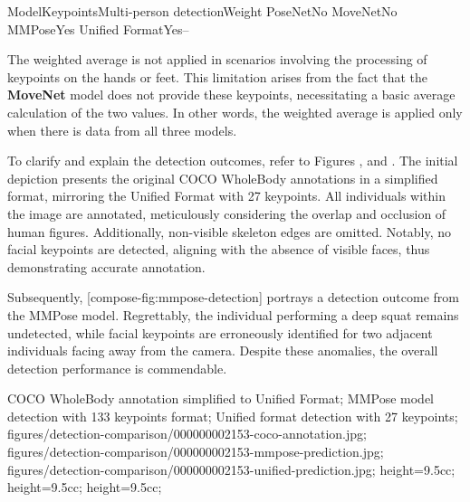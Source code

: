     \setupTABLE[r][1][style=bold]
    \setupTABLE[c][each][offset=3dd]
    \setupTABLE[frame=off]
    \setupTABLE[r][1][topframe=on,bottomframe=on]
    \setupTABLE[c][each][leftframe=on]
    \setupTABLE[c][1][leftframe=off]
    \setupTABLE[c][2,3,4][align=middle]
    \bTR\bTD Model\eTD\bTD              Keypoints\eTD\bTD  Multi-person detection\eTD\bTD  Weight\eTD\eTR
    \bTR\bTD PoseNet\eTD{}\eTD\bTD         No\eTD{}\eTD\eTR
    \bTR\bTD MoveNet\eTD{}\eTD\bTD         No\eTD{}\eTD\eTR
    \bTR\bTD MMPose\eTD{}\eTD\bTD        Yes\eTD{}\eTD\eTR
    \bTR\bTD Unified Format\eTD{}\eTD\bTD         Yes\eTD\bTD                     --\eTD\eTR


The weighted average is not applied in scenarios involving the processing of keypoints on the hands or feet. This limitation arises from the fact that the {\bf MoveNet} model does not provide these keypoints, necessitating a basic average calculation of the two values. In other words, the weighted average is applied only when there is data from all three models.

To clarify and explain the detection outcomes, refer to Figures ,  and . The initial depiction presents the original COCO WholeBody annotations in a simplified format, mirroring the Unified Format with 27 keypoints. All individuals within the image are annotated, meticulously considering the overlap and occlusion of human figures. Additionally, non-visible skeleton edges are omitted. Notably, no facial keypoints are detected, aligning with the absence of visible faces, thus demonstrating accurate annotation.

Subsequently, [compose-fig:mmpose-detection] portrays a detection outcome from the MMPose model. Regrettably, the individual performing a deep squat remains undetected, while facial keypoints are erroneously identified for two adjacent individuals facing away from the camera. Despite these anomalies, the overall detection performance is commendable.

    {
        COCO WholeBody annotation simplified to Unified Format;
        MMPose model detection with 133 keypoints format;
        Unified format detection with 27 keypoints;
    }
    {
        figures/detection-comparison/000000002153-coco-annotation.jpg;
        figures/detection-comparison/000000002153-mmpose-prediction.jpg;
        figures/detection-comparison/000000002153-unified-prediction.jpg;
    }
    {
        height=9.5cc;
        height=9.5cc;
        height=9.5cc;
    }

